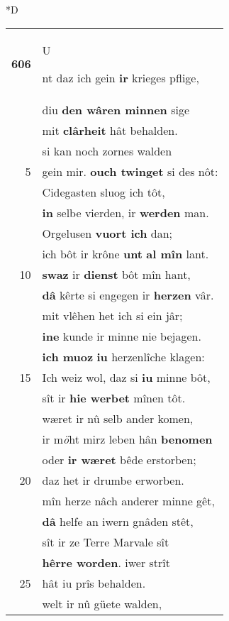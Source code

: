 \documentclass[8pt,a4paper,notitlepage]{article}
\begin{document}
\begin{table}[ht]
\begin{minipage}[t]{0.5\linewidth}
\small
\begin{center}*D
\end{center}
\begin{tabular}{rl}
\textbf{606} & \begin{large}U\end{large}nt daz ich gein \textbf{ir} krieges pflige,\\ 
 & diu \textbf{den wâren minnen} sige\\ 
 & mit \textbf{clârheit} hât behalden.\\ 
 & si kan noch zornes walden\\ 
5 & gein mir. \textbf{ouch twinget} si des nôt:\\ 
 & Cidegasten sluog ich tôt,\\ 
 & \textbf{in} selbe vierden, ir \textbf{werden} man.\\ 
 & Orgelusen \textbf{vuort ich} dan;\\ 
 & ich bôt ir krône \textbf{unt} \textbf{al mîn} lant.\\ 
10 & \textbf{swaz} ir \textbf{dienst} bôt mîn hant,\\ 
 & \textbf{dâ} kêrte si engegen ir \textbf{herzen} vâr.\\ 
 & mit vlêhen het ich si ein jâr;\\ 
 & \textbf{ine} kunde ir minne nie bejagen.\\ 
 & \textbf{ich muoz} \textbf{iu} herzenlîche klagen:\\ 
15 & Ich weiz wol, daz si \textbf{iu} minne bôt,\\ 
 & sît ir \textbf{hie werbet} mînen tôt.\\ 
 & wæret ir nû selb ander komen,\\ 
 & ir m\textit{ö}ht mirz leben hân \textbf{benomen}\\ 
 & oder \textbf{ir wæret} bêde erstorben;\\ 
20 & daz het ir drumbe erworben.\\ 
 & mîn herze nâch anderer minne gêt,\\ 
 & \textbf{dâ} helfe an iwern gnâden stêt,\\ 
 & sît ir ze Terre Marvale sît\\ 
 & \textbf{hêrre worden}. iwer strît\\ 
25 & hât iu prîs behalden.\\ 
 & welt ir nû güete walden,\\ 

\end{tabular}
\end{minipage}
\end{table}
\end{document}
